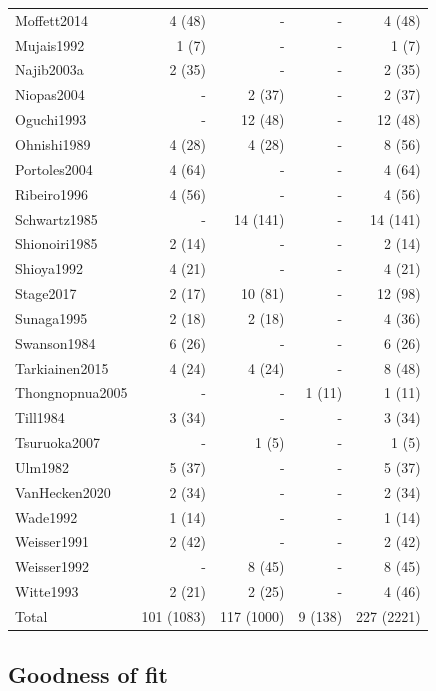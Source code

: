 \begin{longtable}{lrrrr}
Moffett2014 & 4 (48) & - & - & 4 (48) \\
Mujais1992 & 1 (7) & - & - & 1 (7) \\
Najib2003a & 2 (35) & - & - & 2 (35) \\
Niopas2004 & - & 2 (37) & - & 2 (37) \\
Oguchi1993 & - & 12 (48) & - & 12 (48) \\
Ohnishi1989 & 4 (28) & 4 (28) & - & 8 (56) \\
Portoles2004 & 4 (64) & - & - & 4 (64) \\
Ribeiro1996 & 4 (56) & - & - & 4 (56) \\
Schwartz1985 & - & 14 (141) & - & 14 (141) \\
Shionoiri1985 & 2 (14) & - & - & 2 (14) \\
Shioya1992 & 4 (21) & - & - & 4 (21) \\
Stage2017 & 2 (17) & 10 (81) & - & 12 (98) \\
Sunaga1995 & 2 (18) & 2 (18) & - & 4 (36) \\
Swanson1984 & 6 (26) & - & - & 6 (26) \\
Tarkiainen2015 & 4 (24) & 4 (24) & - & 8 (48) \\
Thongnopnua2005 & - & - & 1 (11) & 1 (11) \\
Till1984 & 3 (34) & - & - & 3 (34) \\
Tsuruoka2007 & - & 1 (5) & - & 1 (5) \\
Ulm1982 & 5 (37) & - & - & 5 (37) \\
VanHecken2020 & 2 (34) & - & - & 2 (34) \\
Wade1992 & 1 (14) & - & - & 1 (14) \\
Weisser1991 & 2 (42) & - & - & 2 (42) \\
Weisser1992 & - & 8 (45) & - & 8 (45) \\
Witte1993 & 2 (21) & 2 (25) & - & 4 (46) \\
Total & 101 (1083) & 117 (1000) & 9 (138) & 227 (2221) \\
\end{longtable}

\subsection{Goodness of fit}

